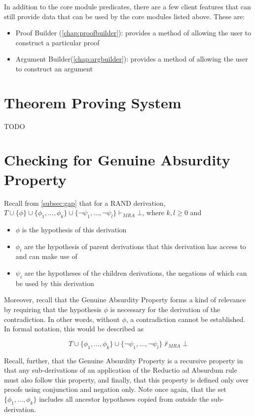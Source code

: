 \documentclass[11pt,twoside,a4paper]{report}
\begin{document}
In addition to the core module predicates, there are a few client features that can still provide data that can be used by the core modules listed above. These are:
\begin{itemize}
\item
Proof Builder (\autoref{chap:proofbuilder}): provides a method of allowing the user to construct a particular proof
\item
Argument Builder(\autoref{chap:argbuilder}): provides a method of allowing the user to construct an argument 
\end{itemize}

\chapter{Theorem Proving System}
\label{chap:prover}
TODO

\chapter{Checking for Genuine Absurdity Property}
\label{chap:gapcheck}
Recall from \autoref{subsec:gap} that for a RAND derivation, $T\cup\{\phi\}\cup\{\phi_1, ..., \phi_k\}\cup\{\neg\psi_1, ..., \neg\psi_l\}\vdash_{MRA}\bot$, where $k, l \geq 0$ and

\begin{itemize}
\item
$\phi$ is the hypothesis of this derivation
\item
$\phi_i$ are the hypothesis of parent derivations that this derivation has access to and can make use of
\item
$\psi_i$ are the hypotheses of the children derivations, the negations of which can be used by this derivation
\end{itemize}

Moreover, recall that the Genuine Absurdity Property forms a kind of relevance by requiring that the hypothesis $\phi$ is necessary for the derivation of the contradiction. In other words, without $\phi$, a contradiction cannot be established. In formal notation, this would be described as

\[T\cup\{\phi_1, ..., \phi_k\}\cup\{\neg\psi_1, ..., \neg\psi_l\}\nvdash_{MRA}\bot\]

Recall, further, that the Genuine Absurdity Property is a recursive property in that any sub-derivations of an application of the Reductio ad Absurdum rule must also follow this property, and finally, that this property is defined only over proofs using conjunction and negation only. Note once again, that the set $\{\phi_1, ..., \phi_k\}$ includes all ancestor hypotheses copied from outside the sub-derivation.
\end{document}
